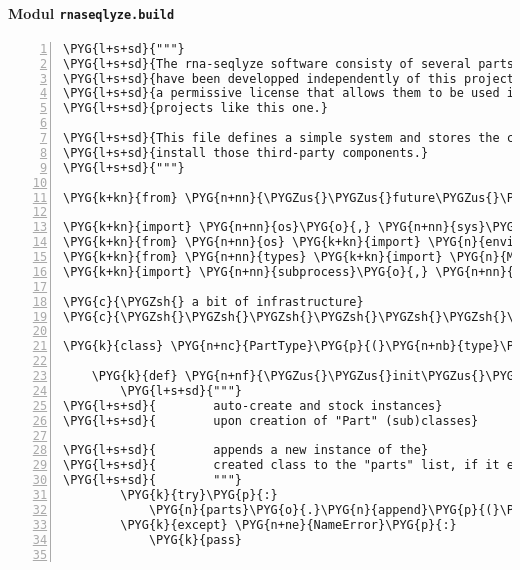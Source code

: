\paragraph{Modul \texttt{rnaseqlyze.build}}
\label{rnaseqlyze-pdf:modul-rnaseqlyze-build}
\begin{Verbatim}[commandchars=\\\{\},numbers=left,firstnumber=1,stepnumber=5]
\PYG{l+s+sd}{"""}
\PYG{l+s+sd}{The rna-seqlyze software consisty of several parts. The majority of those parts}
\PYG{l+s+sd}{have been developped independently of this project and have been released under}
\PYG{l+s+sd}{a permissive license that allows them to be used in other (permissive licenced)}
\PYG{l+s+sd}{projects like this one.}

\PYG{l+s+sd}{This file defines a simple system and stores the commands necessary to build and}
\PYG{l+s+sd}{install those third-party components.}
\PYG{l+s+sd}{"""}

\PYG{k+kn}{from} \PYG{n+nn}{\PYGZus{}\PYGZus{}future\PYGZus{}\PYGZus{}} \PYG{k+kn}{import} \PYG{n}{print\PYGZus{}function}

\PYG{k+kn}{import} \PYG{n+nn}{os}\PYG{o}{,} \PYG{n+nn}{sys}\PYG{o}{,} \PYG{n+nn}{shutil}
\PYG{k+kn}{from} \PYG{n+nn}{os} \PYG{k+kn}{import} \PYG{n}{environ} \PYG{k}{as} \PYG{n}{env}
\PYG{k+kn}{from} \PYG{n+nn}{types} \PYG{k+kn}{import} \PYG{n}{MethodType}
\PYG{k+kn}{import} \PYG{n+nn}{subprocess}\PYG{o}{,} \PYG{n+nn}{multiprocessing}

\PYG{c}{\PYGZsh{} a bit of infrastructure}
\PYG{c}{\PYGZsh{}\PYGZsh{}\PYGZsh{}\PYGZsh{}\PYGZsh{}\PYGZsh{}\PYGZsh{}\PYGZsh{}\PYGZsh{}\PYGZsh{}\PYGZsh{}\PYGZsh{}\PYGZsh{}\PYGZsh{}\PYGZsh{}\PYGZsh{}\PYGZsh{}\PYGZsh{}\PYGZsh{}\PYGZsh{}\PYGZsh{}\PYGZsh{}\PYGZsh{}\PYGZsh{}\PYGZsh{}}

\PYG{k}{class} \PYG{n+nc}{PartType}\PYG{p}{(}\PYG{n+nb}{type}\PYG{p}{)}\PYG{p}{:}

    \PYG{k}{def} \PYG{n+nf}{\PYGZus{}\PYGZus{}init\PYGZus{}\PYGZus{}}\PYG{p}{(}\PYG{n}{cls}\PYG{p}{,} \PYG{o}{*}\PYG{n}{ign}\PYG{p}{)}\PYG{p}{:}
        \PYG{l+s+sd}{"""}
\PYG{l+s+sd}{        auto-create and stock instances}
\PYG{l+s+sd}{        upon creation of "Part" (sub)classes}

\PYG{l+s+sd}{        appends a new instance of the}
\PYG{l+s+sd}{        created class to the "parts" list, if it exists}
\PYG{l+s+sd}{        """}
        \PYG{k}{try}\PYG{p}{:}
            \PYG{n}{parts}\PYG{o}{.}\PYG{n}{append}\PYG{p}{(}\PYG{n}{cls}\PYG{p}{(}\PYG{p}{)}\PYG{p}{)}
        \PYG{k}{except} \PYG{n+ne}{NameError}\PYG{p}{:}
            \PYG{k}{pass}


\end{Verbatim}
